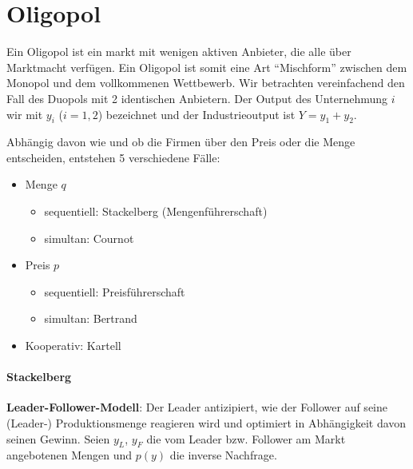 \chapter{Oligopol}

Ein Oligopol ist ein markt mit wenigen aktiven Anbieter, die alle über Marktmacht verfügen. Ein Oligopol ist somit eine Art \enquote{Mischform} zwischen dem Monopol und dem vollkommenen Wettbewerb. Wir betrachten vereinfachend den Fall des Duopols mit 2 identischen Anbietern. Der Output des Unternehmung $i$ wir mit $y_i$ ($i=1,2$) bezeichnet und der Industrieoutput ist $Y = y_1 + y_2$. ~\bigskip

Abhängig davon wie und ob die Firmen über den Preis oder die Menge entscheiden, entstehen 5 verschiedene Fälle:
\begin{itemize}
	\item Menge $q$
		\begin{itemize}
			\item sequentiell: Stackelberg (Mengenführerschaft)
			\item simultan: Cournot
		\end{itemize}
	\item Preis $p$
		\begin{itemize}
			\item sequentiell: Preisführerschaft
			\item simultan: Bertrand
		\end{itemize}		
	\item Kooperativ: Kartell
\end{itemize}

\subsubsection*{Stackelberg}

\textbf{Leader-Follower-Modell}: Der Leader antizipiert, wie der Follower auf seine (Leader-) Produktionsmenge reagieren wird und optimiert in Abhängigkeit davon seinen Gewinn. Seien $y_L$, $y_F$ die vom Leader bzw. Follower am Markt angebotenen Mengen und $p(y)$ die inverse Nachfrage.

